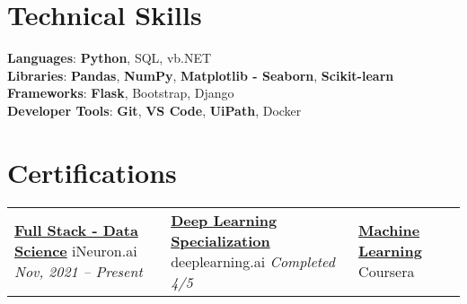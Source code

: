 \documentclass[letterpaper,11pt]{article}
\begin{document}
\section{Technical Skills}
 \begin{itemize}[leftmargin=0.15in, label={}]
    \small{\item{
     \textbf{Languages}{: {\bfseries{Python}}, 
                          {SQL}, 
                          {vb.NET}} \\
     \textbf{Libraries}{: {\bfseries{Pandas}}, 
                          {\bfseries{NumPy}},
                          {\bfseries{Matplotlib - Seaborn}},
                          {\bfseries{Scikit-learn}}}\\
     \textbf{Frameworks}{: {\bfseries{Flask}},
                          {Bootstrap},
                          {Django}} \\
     \textbf{Developer Tools}{: 
                          {\bfseries{Git}},
                          {\bfseries{VS Code}},
                          {\bfseries{UiPath}}, 
                          {Docker}} \\
    }}
 \end{itemize}

\section{Certifications}
 \begin{itemize}[leftmargin=0.15in, label={}]

\begin{tabularx}{\linewidth}{ @{} X X X @{} }
    \href{https://ineuron.ai/course/Full-Stack-Data-Science-Nov'21-Batch}
    {\bfseries{Full Stack - Data Science}}\hfill \break
    iNeuron.ai\hfill \break
    {\textit{Nov, 2021 -- Present}}

    &
    
    \href{https://drive.google.com/file/d/1nlAGjIDLMqbXyDVl-Py22eLMO2MyzlGz/view?usp=sharing}
    {\bfseries{Deep Learning Specialization}}\hfill \break
    deeplearning.ai\hfill \break
    {\textit{Completed 4/5}}

    &
    
    \href{https://www.coursera.org/learn/machine-learning}
    {\bfseries{Machine Learning}}\hfill \break
    Coursera
\end{tabularx}
 \end{itemize}
\end{document}
